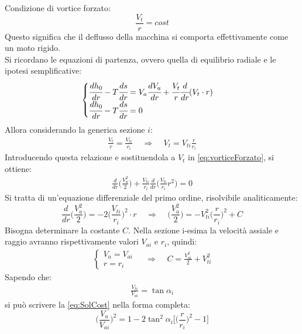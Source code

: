 Condizione di vortice forzato:
\begin{equation}
\boxed{\frac{V_t}{r} = cost}
\label{eq:VortForz}
\end{equation}
Questo significa che il deflusso della macchina si comporta effettivamente come un moto rigido.\\
Si ricordano le equazioni di partenza, ovvero quella di equilibrio radiale e le ipotesi semplificative:
\begin{equation}
\begin{cases}
\cfrac{dh_0}{dr} - T\cfrac{ds}{dr} = V_a \cfrac{dV_a}{dr} + \cfrac{V_t}{r} \cfrac{d}{dr}(V_t \cdot r)\\
\cfrac{dh_0}{dr} - T\cfrac{ds}{dr} = 0
\end{cases}
\label{eq:vorticeForzato}
\end{equation}
Allora considerando la generica sezione $i$:
\begin{align*}
\frac{V_t}{r} = \frac{V_{ti}}{r_i} \;\;\;\; \Rightarrow \;\;\;\; V_t = V_{ti} \frac{r}{r_i}
\end{align*}
Introducendo questa relazione e sostituendola a $V_{t}$ in \ref{eq:vorticeForzato}, si ottiene:
\begin{align*}
\frac{d}{dr}\bigg( \frac{V_a^2}{2} \bigg) + \frac{V_{ti}}{r_i} \frac{d}{dr} \bigg(\frac{V_{ti}}{r_i} r^2 \bigg) = 0
\end{align*}
Si tratta di un'equazione differenziale del primo ordine, risolvibile analiticamente:
\begin{equation}
\frac{d}{dr} \bigg( \frac{V_a^2}{2} \bigg) = -2 \bigg( \frac{V_{ti}}{r_i} \bigg) ^2 \cdot r
\;\;\;\; \Rightarrow \;\;\;\; 
\bigg( \frac{V_a^2}{2} \bigg) = - V_{ti}^2 \bigg(\frac{r}{r_i} \bigg)^2 +C
\label{eq:SolCost}
\end{equation}
Bisogna determinare la costante $C$. Nella sezione i-esima la velocità assiale e raggio avranno rispettivamente valori $V_{ai}$ e $r_i$, quindi:
\begin{align*}
\begin{cases}
V_a=V_{ai}\\
r=r_i
\end{cases}
\;\;\;\; \Rightarrow \;\;\;\;
C = \frac{V_{ai}^2}{2} +  V_{ti}^2
\end{align*}
Sapendo che:
\begin{align*}
\frac{V_{ti}}{V_{ai}} = \tan \alpha_i
\end{align*}
si può scrivere la \ref{eq:SolCost} nella forma completa:
\begin{equation}
\boxed{ \bigg( \frac{V_a}{V_{ai}} \bigg)^2 = 1- 2 \tan^2 \alpha_i \bigg[ \bigg( \frac{r}{r_i} \bigg)^2 -1 \bigg] }
\label{eq:RappVol}
\end{equation}
